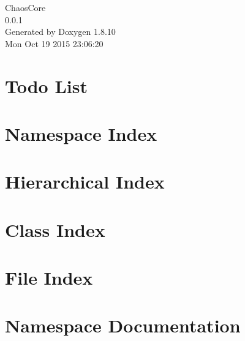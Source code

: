 \documentclass[twoside]{book}
\newcommand{\+}{\discretionary{\mbox{\scriptsize$\hookleftarrow$}}{}{}}
\newcommand{\clearemptydoublepage}{%
  \newpage{\pagestyle{empty}\cleardoublepage}%
}
\begin{document}
\hypersetup{pageanchor=false,
             bookmarks=true,
             bookmarksnumbered=true,
             pdfencoding=unicode
            }
\begin{titlepage}
\vspace*{7cm}
\begin{center}%
{\Large Chaos\+Core \\[1ex]\large 0.\+0.\+1 }\\
\vspace*{1cm}
{\large Generated by Doxygen 1.8.10}\\
\vspace*{0.5cm}
{\small Mon Oct 19 2015 23:06:20}\\
\end{center}
\end{titlepage}
\clearemptydoublepage
\tableofcontents
\clearemptydoublepage
{}
\hypersetup{pageanchor=true}

\chapter{Todo List}
\label{todo}
\hypertarget{todo}{}

\chapter{Namespace Index}

\chapter{Hierarchical Index}

\chapter{Class Index}

\chapter{File Index}

\chapter{Namespace Documentation}










\end{document}
